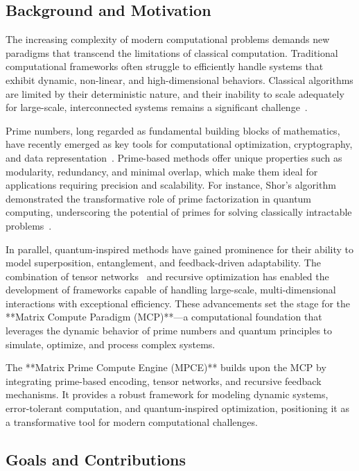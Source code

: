\documentclass{article}
\theoremstyle{plain}
\begin{document}
\subsection{Background and Motivation}

The increasing complexity of modern computational problems demands new paradigms that transcend the limitations of classical computation. Traditional computational frameworks often struggle to efficiently handle systems that exhibit dynamic, non-linear, and high-dimensional behaviors. Classical algorithms are limited by their deterministic nature, and their inability to scale adequately for large-scale, interconnected systems remains a significant challenge~\cite{hardy2008introduction, feynman2010quantum}.

Prime numbers, long regarded as fundamental building blocks of mathematics, have recently emerged as key tools for computational optimization, cryptography, and data representation~\cite{riemann1859hypothesis, shor1994algorithms}. Prime-based methods offer unique properties such as modularity, redundancy, and minimal overlap, which make them ideal for applications requiring precision and scalability. For instance, Shor's algorithm demonstrated the transformative role of prime factorization in quantum computing, underscoring the potential of primes for solving classically intractable problems~\cite{shor1994algorithms}.

In parallel, quantum-inspired methods have gained prominence for their ability to model superposition, entanglement, and feedback-driven adaptability. The combination of tensor networks~\cite{white1992tensor, vidal2003efficient} and recursive optimization has enabled the development of frameworks capable of handling large-scale, multi-dimensional interactions with exceptional efficiency. These advancements set the stage for the **Matrix Compute Paradigm (MCP)**---a computational foundation that leverages the dynamic behavior of prime numbers and quantum principles to simulate, optimize, and process complex systems.

The **Matrix Prime Compute Engine (MPCE)** builds upon the MCP by integrating prime-based encoding, tensor networks, and recursive feedback mechanisms. It provides a robust framework for modeling dynamic systems, error-tolerant computation, and quantum-inspired optimization, positioning it as a transformative tool for modern computational challenges.

\subsection{Goals and Contributions}
\end{document}
